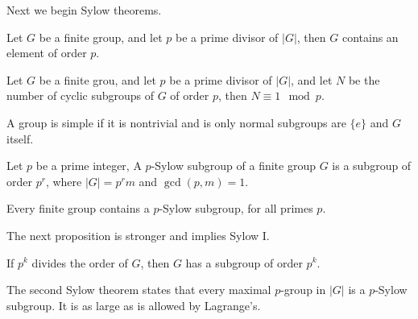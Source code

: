 \documentclass[openany]{book}
\begin{document}
Next we begin Sylow theorems.

\begin{prop}
    Let $G$ be a finite group, and let $p$ be a prime divisor of $|G|$, then $G$ contains an element of order $p$.
\end{prop}
\begin{cor}
    Let $G$ be a finite grou, and let $p$ be a prime divisor of $|G|$, and let $N$ be the number of cyclic subgroups of $G$ of order $p$, then $N\equiv 1\mod p$.
\end{cor}

\begin{defn}
    A group is simple if it is nontrivial and is only normal subgroups are $\{e\}$ and $G$ itself.
\end{defn}

\begin{defn}
    Let $p$ be a prime integer, A $p$-Sylow subgroup of a finite group $G$ is a subgroup of order $p^r$, where $|G|=p^rm$ and $\gcd(p,m)=1$. 
\end{defn}
\begin{thm}[Sylow I]
    Every finite group contains a $p$-Sylow subgroup, for all primes $p$.
\end{thm}
The next proposition is stronger and implies Sylow I.
\begin{prop}
    If $p^k$ divides the order of $G$, then $G$ has a subgroup of order $p^k$.
\end{prop}
The second Sylow theorem states that every maximal $p$-group in $|G|$ is a $p$-Sylow subgroup. It is as large as is allowed by Lagrange's.
\end{document}
